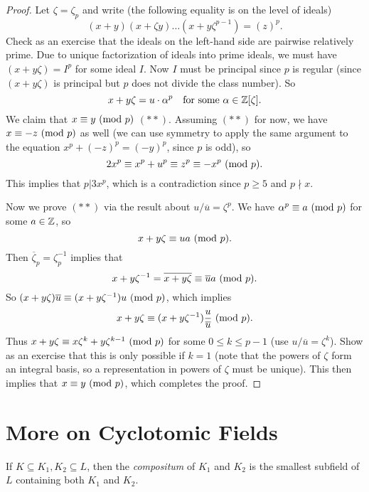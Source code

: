 \begin{proof}
  Let $\zeta = \zeta_p$ and write
  (the following equality is on the level of
  ideals)
  \[
    (x + y)(x + \zeta y) \dots (x + y \zeta^{p - 1}) = (z)^p. \tag{$*$}
  \]
  Check as an exercise that the ideals on the left-hand
  side are pairwise relatively prime. Due to
  unique factorization of ideals into prime ideals,
  we must have $(x + y \zeta) = I^p$ for some ideal $I$.
  Now $I$ must be principal since $p$ is regular
  (since $(x + y \zeta)$ is principal but $p$ does
  not divide the class number). So
  \[
    x + y \zeta = u \cdot \alpha^p \quad \text{for some } \alpha \in \mathbb{Z}[\zeta].
  \]
  We claim that $x \equiv y \ (\mathrm{mod}\ p)$ $(**)$.
  Assuming $(**)$ for now, we have $x \equiv -z \ (\mathrm{mod}\ p)$
  as well (we can use symmetry to apply the same argument
  to the equation $x^p + (-z)^p = (-y)^p$, since
  $p$ is odd), so
  \[
    2x^p \equiv x^p + u^p \equiv z^p \equiv -x^p \ (\mathrm{mod}\ p).
  \]
  This implies that $p | 3x^p$, which is a contradiction
  since $p \ge 5$ and $p \nmid x$.

  Now we prove $(**)$ via the result about
  $u / \overline{u} = \zeta^p$. We have
  $\alpha^p \equiv a \ (\mathrm{mod}\ p)$ for some $a \in \mathbb{Z}$, so
  \[
    x + y\zeta \equiv u a \ (\mathrm{mod}\ p).
  \]
  Then  $\overline{\zeta}_p = \zeta_p^{-1}$
  implies that
  \[
    x + y\zeta^{-1} = \overline{x + y\zeta} \equiv \overline{u} a \ (\mathrm{mod}\ p).
  \]
  So $(x + y\zeta) \overline{u} \equiv (x + y\zeta^{-1}) u \ (\mathrm{mod}\ p)$,
  which implies
  \[
    x + y\zeta \equiv (x + y\zeta^{-1}) \frac{u}{\overline{u}} \ (\mathrm{mod}\ p).
  \]
  Thus $x + y\zeta \equiv x \zeta^k + y\zeta^{k - 1} \ (\mathrm{mod}\ p)$
  for some $0 \le k \le p - 1$ (use
  $u / \overline{u} = \zeta^k$). Show as an exercise
  that this is only possible if $k = 1$ (note that
  the powers of $\zeta$ form an integral basis, so
  a representation in powers of $\zeta$ must be unique).
  This then implies that $x \equiv y \ (\mathrm{mod}\ p)$, which
  completes the proof.
\end{proof}

\section{More on Cyclotomic Fields}

\begin{definition}
  If $K \subseteq K_1, K_2 \subseteq L$,
  then the \emph{compositum} of $K_1$ and $K_2$ is the
  smallest subfield of $L$ containing both $K_1$ and
  $K_2$.
\end{definition}

